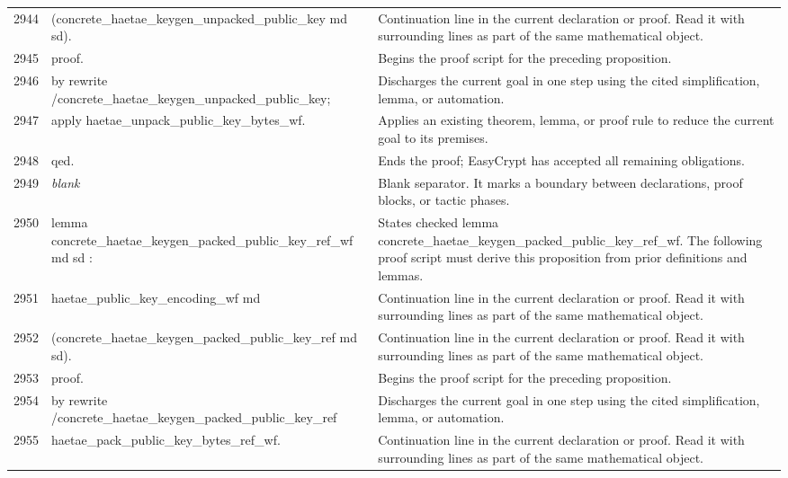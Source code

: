 \documentclass[10pt]{article}
\begin{document}
\begin{longtable}{r L{0.53\textwidth} L{0.37\textwidth}}
2944 & {\ttfamily\scriptsize     (concrete\_haetae\_keygen\_unpacked\_public\_key md sd).} & Continuation line in the current declaration or proof.  Read it with surrounding lines as part of the same mathematical object. \\
2945 & {\ttfamily\scriptsize proof.} & Begins the proof script for the preceding proposition. \\
2946 & {\ttfamily\scriptsize by rewrite /concrete\_haetae\_keygen\_unpacked\_public\_key;} & Discharges the current goal in one step using the cited simplification, lemma, or automation. \\
2947 & {\ttfamily\scriptsize    apply haetae\_unpack\_public\_key\_bytes\_wf.} & Applies an existing theorem, lemma, or proof rule to reduce the current goal to its premises. \\
2948 & {\ttfamily\scriptsize qed.} & Ends the proof; EasyCrypt has accepted all remaining obligations. \\
2949 & {\ttfamily\scriptsize \emph{blank}} & Blank separator.  It marks a boundary between declarations, proof blocks, or tactic phases. \\
2950 & {\ttfamily\scriptsize lemma concrete\_haetae\_keygen\_packed\_public\_key\_ref\_wf md sd :} & States checked lemma concrete\_haetae\_keygen\_packed\_public\_key\_ref\_wf.  The following proof script must derive this proposition from prior definitions and lemmas. \\
2951 & {\ttfamily\scriptsize   haetae\_public\_key\_encoding\_wf md} & Continuation line in the current declaration or proof.  Read it with surrounding lines as part of the same mathematical object. \\
2952 & {\ttfamily\scriptsize     (concrete\_haetae\_keygen\_packed\_public\_key\_ref md sd).} & Continuation line in the current declaration or proof.  Read it with surrounding lines as part of the same mathematical object. \\
2953 & {\ttfamily\scriptsize proof.} & Begins the proof script for the preceding proposition. \\
2954 & {\ttfamily\scriptsize by rewrite /concrete\_haetae\_keygen\_packed\_public\_key\_ref} & Discharges the current goal in one step using the cited simplification, lemma, or automation. \\
2955 & {\ttfamily\scriptsize            haetae\_pack\_public\_key\_bytes\_ref\_wf.} & Continuation line in the current declaration or proof.  Read it with surrounding lines as part of the same mathematical object. \\

\end{longtable}
\end{document}
